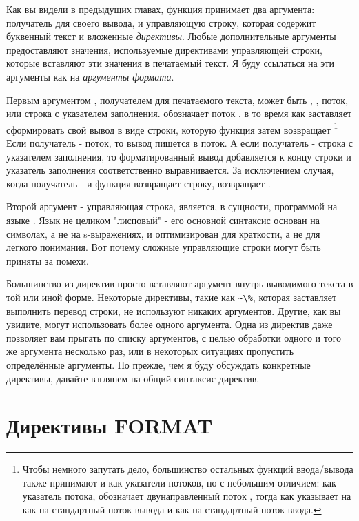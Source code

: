 {Как вы видели в предыдущих главах, функция  принимает два аргумента:
получатель для своего вывода, и управляющую строку, которая содержит буквенный текст и
вложенные \textit{директивы}. Любые дополнительные аргументы предоставляют значения,
используемые директивами управляющей строки, которые вставляют эти значения в печатаемый
текст. Я буду ссылаться на эти аргументы как на \textit{аргументы формата}.

Первым аргументом , получателем для печатаемого текста, может быть ,
, поток, или строка с указателем заполнения.  обозначает поток
, в то время как  заставляет  сформировать
свой вывод в виде строки, которую функция затем возвращает \footnote{Чтобы немного
  запутать дело, большинство остальных функций ввода/вывода также принимают  и
   как указатели потоков, но с небольшим отличием: как указатель потока,
   обозначает двунаправленный поток , тогда как 
  указывает на  как на стандартный поток вывода и
   как на стандартный поток ввода.} Если получатель - поток, то
вывод пишется в поток. А если получатель - строка с указателем заполнения, то
форматированный вывод добавляется к концу строки и указатель заполнения соответственно
выравнивается. За исключением случая, когда получатель -  и функция возвращает
строку,  возвращает .

Второй аргумент - управляющая строка, является, в сущности, программой на языке
. Язык  не целиком "лисповый" - его основной синтаксис основан
на символах, а не на s-выражениях, и оптимизирован для краткости, а не для легкого
понимания. Вот почему сложные управляющие строки  могут быть приняты за
помехи.

Большинство из директив  просто вставляют аргумент внутрь выводимого текста в
той или иной форме. Некоторые директивы, такие как \lstinline!~\%!, которая заставляет
 выполнить перевод строки, не используют никаких аргументов. Другие, как вы
увидите, могут использовать более одного аргумента. Одна из директив даже позволяет вам
прыгать по списку аргументов, с целью обработки одного и того же аргумента несколько раз,
или в некоторых ситуациях пропустить определённые аргументы. Но прежде, чем я буду
обсуждать конкретные директивы, давайте взглянем на общий синтаксис директив.

\section{Директивы FORMAT}

}
